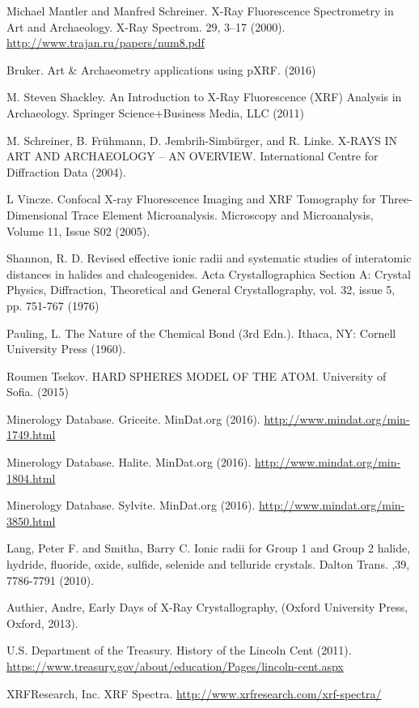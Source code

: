 \documentclass[%
 reprint,
 amsmath,amssymb,
 aps,
 pra,
]{revtex4-1}
\begin{document}
\begin{thebibliography}{6}
	Michael Mantler and Manfred Schreiner. X-Ray Fluorescence Spectrometry in Art and Archaeology. X-Ray Spectrom. 29, 3–17 (2000). \url{http://www.trajan.ru/papers/num8.pdf}
	
	Bruker. Art \& Archaeometry applications using pXRF. (2016)
	
	M. Steven Shackley. An Introduction to X-Ray Fluorescence (XRF) Analysis in Archaeology. Springer Science+Business Media, LLC (2011)
	
	M. Schreiner, B. Frühmann, D. Jembrih-Simbürger, and R. Linke. X-RAYS IN ART AND ARCHAEOLOGY – AN OVERVIEW.  International Centre for Diffraction Data (2004).
	
	L Vincze. Confocal X-ray Fluorescence Imaging and XRF Tomography for Three-Dimensional Trace Element Microanalysis. Microscopy and Microanalysis, Volume 11, Issue S02 (2005).
	
	Shannon, R. D. Revised effective ionic radii and systematic studies of interatomic distances in halides and chalcogenides. Acta Crystallographica Section A: Crystal Physics, Diffraction, Theoretical and General Crystallography, vol. 32, issue 5, pp. 751-767 (1976)
	
	Pauling, L. The Nature of the Chemical Bond (3rd Edn.). Ithaca, NY: Cornell University Press (1960).
	
	Roumen Tsekov. HARD SPHERES MODEL OF THE ATOM. University of Sofia. (2015)
	
	Minerology Database. Griceite. MinDat.org (2016). \url{http://www.mindat.org/min-1749.html}
	
	Minerology Database. Halite. MinDat.org (2016). \url{http://www.mindat.org/min-1804.html}
	
	Minerology Database. Sylvite. MinDat.org (2016). \url{http://www.mindat.org/min-3850.html}
	
	Lang, Peter F. and Smitha, Barry C. Ionic radii for Group 1 and Group 2 halide, hydride, fluoride, oxide, sulfide, selenide and telluride crystals. Dalton Trans. ,39, 7786-7791 (2010).
	
	Authier, Andre, Early Days of X-Ray Crystallography, (Oxford University Press, Oxford, 2013).
	
	U.S. Department of the Treasury. History of the Lincoln Cent (2011). \url{https://www.treasury.gov/about/education/Pages/lincoln-cent.aspx}
	
	XRFResearch, Inc. XRF Spectra. \url{http://www.xrfresearch.com/xrf-spectra/}


\end{thebibliography}
\end{document}
